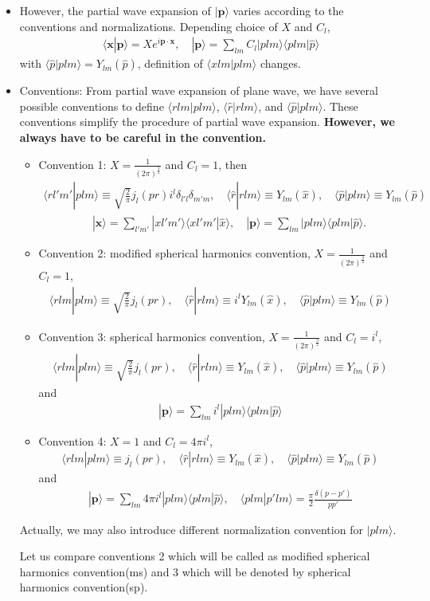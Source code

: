 \documentclass[10pt]{article}
\def\bm{\boldsymbol}
\newcommand{\bea}{\begin{eqnarray}}
\newcommand{\eea}{\end{eqnarray}}
\def\vp{{\bm p}}
\def\vx{{\bm x}}
\def\la{\langle}
\def\ra{\rangle}
\begin{document}
\begin{itemize}
\item However, the partial wave expansion of $|\vp\ra$ varies
 according to the conventions and normalizations.
Depending choice of $X$ and $C_l$,
\bea
\la \vx|\vp\ra=X e^{i\vp\cdot\vx},\quad
|\vp\ra=\sum_{lm} C_l |plm\ra\la p lm|\hat{p}\ra 
\eea
with $\la \hat{p}|p lm\ra=Y_{lm}(\hat{p})$, definition of 
$\la x lm|p lm\ra$ changes. 

\item Conventions: From partial wave expansion of
plane wave, we have several possible conventions to 
define $\la r lm|plm\ra$, $\la \hat{r}| r lm\ra$,
and $\la \hat{p}|p lm\ra$. These conventions simplify 
the procedure of partial wave expansion. {\bf However, 
we always have to be careful in the convention.}

\begin{itemize}
\item Convention 1: $X=\frac{1}{(2\pi)^{\frac{3}{2}}}$ and $C_l=1$, 
then
\bea
\la r l'm'|p lm\ra \equiv\sqrt{\frac{2}{\pi}}j_l(pr) i^l
                   \delta_{l'l}\delta_{m'm},\quad
\la \hat{r}| r lm\ra \equiv Y_{lm}(\hat{x}),\quad
\la \hat{p}|p lm\ra\equiv Y_{lm}(\hat{p})
\eea
\bea
& &|\vx\ra=\sum_{l'm'}|xl'm'\ra\la x l'm'|\hat{x}\ra,\quad 
|\vp\ra=\sum_{lm}|plm\ra\la p lm|\hat{p}\ra.
\eea
\item Convention 2: modified spherical harmonics convention,
                   $X=\frac{1}{(2\pi)^{\frac{3}{2}}}$ and $C_l=1$,
\bea
\la r lm|p lm\ra \equiv\sqrt{\frac{2}{\pi}}j_l(pr),\quad
\la \hat{r}| r lm\ra \equiv i^l Y_{lm}(\hat{x}),\quad
\la \hat{p}|p lm\ra \equiv Y_{lm}(\hat{p})
\eea
\item Convention 3: spherical harmonics convention,
              $X=\frac{1}{(2\pi)^{\frac{3}{2}}}$ and $C_l=i^l$,
\bea
\la r lm|p lm\ra \equiv\sqrt{\frac{2}{\pi}}j_l(pr),\quad
\la \hat{r}| r lm\ra \equiv Y_{lm}(\hat{x}),\quad 
\la \hat{p}|p lm\ra \equiv Y_{lm}(\hat{p})
\eea
and           
\bea
|\vp\ra=\sum_{lm} i^l |p lm\ra\la plm|\hat{p}\ra
\eea
\item Convention 4: $X=1$ and $C_l=4\pi i^l$,
\bea
\la r lm|p lm\ra \equiv j_l(pr),\quad
\la \hat{r}| r lm\ra \equiv Y_{lm}(\hat{x}),\quad 
\la \hat{p}|p lm\ra \equiv Y_{lm}(\hat{p})
\eea
and 
\bea
|\vp\ra=\sum_{lm} 4\pi i^l |p lm\ra\la plm|\hat{p}\ra,\quad
\la p lm|p' lm\ra=\frac{\pi}{2}\frac{\delta(p-p')}{pp'}
\eea
\end{itemize}
Actually, we may also introduce different normalization
convention for $|p lm\ra$.

Let us compare
conventions 2 which will be called as modified spherical 
harmonics convention(ms) and 3 which will be denoted
by spherical harmonics convention(sp).


\end{itemize}
\end{document}
